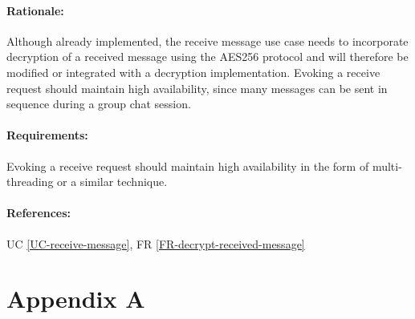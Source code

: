 \documentclass[11pt]{article}
\begin{document}
\paragraph{Rationale:} Although already implemented, the receive message use case needs to incorporate decryption of a received message using the AES256 protocol and will therefore be modified or integrated with a decryption implementation. Evoking a receive request should maintain high availability, since many messages can be sent in sequence during a group chat session.
\paragraph{Requirements:} Evoking a receive request should maintain high availability in the form of multi-threading or a similar technique.
\paragraph{References:} UC \ref{UC-receive-message}, FR \ref{FR-decrypt-received-message}



\newpage

\newpage
\section{Appendix A} \label{appendix-a}
\listoffigures
\end{document}
